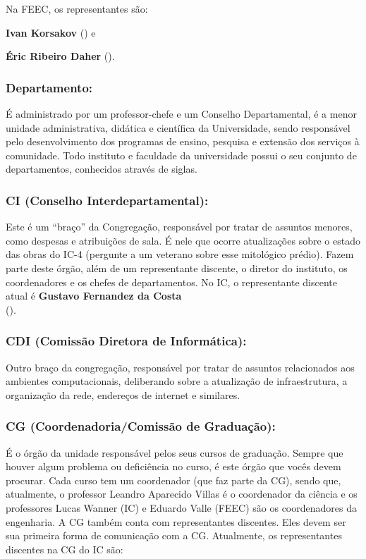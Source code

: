 Na FEEC, os representantes são:

\begin{compactitemize}
\item \textbf{Ivan Korsakov} () e
\item \textbf{Éric Ribeiro Daher} ().
\end{compactitemize}

\subsubsection{Departamento:} É administrado por um professor-chefe e um
Conselho Departamental, é a menor unidade administrativa, didática e científica
da Universidade, sendo responsável pelo desenvolvimento dos programas de
ensino, pesquisa e extensão dos serviços à comunidade. Todo instituto e
faculdade da universidade possui o seu conjunto de departamentos, conhecidos
através de siglas.

\subsubsection{CI (Conselho Interdepartamental):} Este é um ``braço'' da
Congregação, responsável por tratar de assuntos menores, como despesas e
atribuições de sala. É nele que ocorre atualizações sobre o estado das obras do
IC-4 (pergunte a um veterano sobre esse mitológico prédio). Fazem parte deste
órgão, além de um representante discente, o diretor do instituto, os
coordenadores e os chefes de departamentos. No IC, o representante discente
atual é \textbf{Gustavo Fernandez da Costa}\\
().

\subsubsection{CDI (Comissão Diretora de Informática):} Outro braço da
congregação, responsável por tratar de assuntos relacionados aos ambientes
computacionais, deliberando sobre a atualização de infraestrutura, a
organização da rede, endereços de internet e similares.

\subsubsection{CG (Coordenadoria/Comissão de Graduação):} É o órgão da unidade
responsável pelos seus cursos de graduação. Sempre que houver algum problema ou
deficiência no curso, é este órgão que vocês devem procurar.  Cada curso tem um
coordenador (que faz parte da CG), sendo que, atualmente, o professor Leandro
Aparecido Villas é o coordenador da ciência e os professores Lucas Wanner (IC)
e Eduardo Valle (FEEC) são os coordenadores da engenharia. A CG também conta
com representantes discentes. Eles devem ser sua primeira forma de comunicação
com a CG.  Atualmente, os representantes discentes na CG do IC são:

